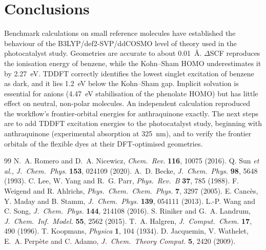 \documentclass[11pt,a4paper]{article}
\begin{document}
\section{Conclusions}

Benchmark calculations on small reference molecules have established the behaviour of the
B3LYP/def2-SVP/ddCOSMO level of theory used in the photocatalyst study. Geometries are accurate to
about 0.01~\AA. $\Delta$SCF reproduces the ionisation energy of benzene, while the Kohn--Sham HOMO
underestimates it by 2.27~eV. TDDFT correctly identifies the lowest singlet excitation of benzene
as dark, and it lies 1.2~eV below the Kohn--Sham gap. Implicit solvation is essential for anions
(4.47~eV stabilisation of the phenolate HOMO) but has little effect on neutral, non-polar molecules.
An independent calculation reproduced the workflow's frontier-orbital energies for anthraquinone
exactly. The next steps are to add TDDFT excitation energies to the photocatalyst study, beginning
with anthraquinone (experimental absorption at 325~nm), and to verify the frontier orbitals of the
flexible dyes at their DFT-optimised geometries.

\begin{thebibliography}{99}\small
{} N.~A. Romero and D.~A. Nicewicz, \emph{Chem.\ Rev.} \textbf{116}, 10075 (2016).
 Q. Sun \emph{et al.}, \emph{J.\ Chem.\ Phys.} \textbf{153}, 024109 (2020).
 A.~D. Becke, \emph{J.\ Chem.\ Phys.} \textbf{98}, 5648 (1993).
 C. Lee, W. Yang and R.~G. Parr, \emph{Phys.\ Rev.\ B} \textbf{37}, 785 (1988).
 F. Weigend and R. Ahlrichs, \emph{Phys.\ Chem.\ Chem.\ Phys.} \textbf{7}, 3297 (2005).
 E. Canc\`es, Y. Maday and B. Stamm, \emph{J.\ Chem.\ Phys.} \textbf{139}, 054111 (2013).
 L.-P. Wang and C. Song, \emph{J.\ Chem.\ Phys.} \textbf{144}, 214108 (2016).
 S. Riniker and G.~A. Landrum, \emph{J.\ Chem.\ Inf.\ Model.} \textbf{55}, 2562 (2015).
 T.~A. Halgren, \emph{J.\ Comput.\ Chem.} \textbf{17}, 490 (1996).
 T. Koopmans, \emph{Physica} \textbf{1}, 104 (1934).
 D. Jacquemin, V. Wathelet, E.~A. Perp\`ete and C. Adamo, \emph{J.\ Chem.\
  Theory Comput.} \textbf{5}, 2420 (2009).
\end{thebibliography}
\end{document}
